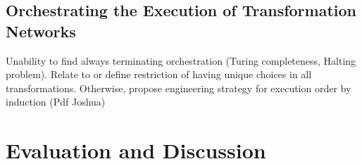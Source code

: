 \section{Orchestrating the Execution of Transformation Networks }
Unability to find always terminating orchestration (Turing completeness, Halting problem). Relate to or define restriction of having unique choices in all transformations. Otherwise, propose engineering strategy for execution order by induction (Pdf Joshua)

\chapter{Evaluation and Discussion }